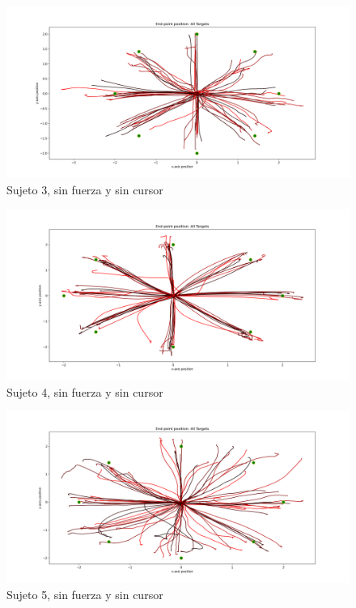 \documentclass[a4paper,11pt, oneside]{book}
\begin{document}
\begin{figure}[H]
	\includegraphics[width=\linewidth]{sujeto3/no_force_no_cursor/trayectorias}
	\caption{Sujeto 3, sin  fuerza y sin cursor}
	\label{3-3-1}
\end{figure}
\begin{figure}[H]
	\includegraphics[width=\linewidth]{sujeto4/no_force_no_cursor/trayectorias}
	\caption{Sujeto 4, sin  fuerza y sin cursor}
	\label{4-3-1}
\end{figure}
\begin{figure}[H]
	\includegraphics[width=\linewidth]{sujeto5/no_force_no_cursor/trayectorias}
	\caption{Sujeto 5, sin  fuerza y sin cursor}
	\label{5-3-1}
\end{figure}
\end{document}
